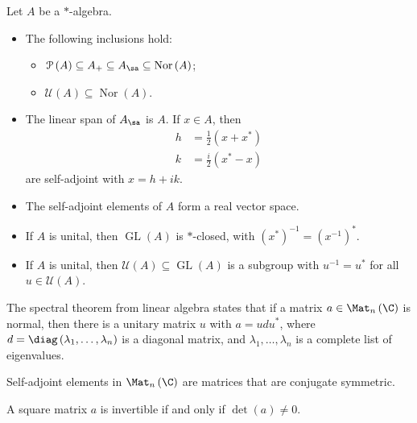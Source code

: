\documentclass[10pt]{mypackage}
\begin{document}
\begin{fact}
  Let $A$ be a $\ast$-algebra.
  \begin{itemize}
    \item The following inclusions hold:
      \begin{itemize}
        \item $\mathcal{P}\left(A\right) \subseteq A_{+}\subseteq A_{\sa} \subseteq \operatorname{Nor}\left(A\right)$;
        \item $\mathcal{U}\left(A\right) \subseteq \operatorname{Nor}\left(A\right)$.
      \end{itemize}
    \item The linear span of $A_{\sa}$ is $A$. If $x\in A$, then
      \begin{align*}
        h &= \frac{1}{2}\left(x + x^{\ast}\right)\\
        k &= \frac{i}{2}\left(x^{\ast} - x\right)
      \end{align*}
      are self-adjoint with $x = h + ik$.
    \item The self-adjoint elements of $A$ form a real vector space.
    \item If $A$ is unital, then $\operatorname{GL}\left(A\right)$ is $\ast$-closed, with $\left(x^{\ast}\right)^{-1} = \left(x^{-1}\right)^{\ast}$.
    \item If $A$ is unital, then $\mathcal{U}\left(A\right)\subseteq \operatorname{GL}\left(A\right)$ is a subgroup with $u^{-1} = u^{\ast}$ for all $u\in \mathcal{U}\left(A\right)$.
  \end{itemize}
\end{fact}
\begin{example}
  The spectral theorem from linear algebra states that if a matrix $a\in\Mat_n\left(\C\right)$ is normal, then there is a unitary matrix $u$ with $a = udu^{\ast}$, where $d = \diag\left(\lambda_1,\dots,\lambda_n\right)$ is a diagonal matrix, and $\lambda_1,\dots,\lambda_n$ is a complete list of eigenvalues.\newline

  Self-adjoint elements in $\Mat_n\left(\C\right)$ are matrices that are conjugate symmetric.\newline

  A square matrix $a$ is invertible if and only if $\det\left(a\right) \neq 0$.
\end{example}
\end{document}
